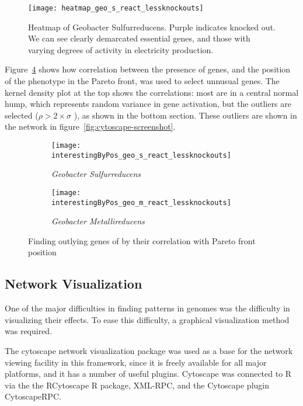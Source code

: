 \documentclass[a4paper,twocolumn]{article}
\begin{document}
\begin{figure}[!htb]
\texttt{[image: heatmap\_geo\_s\_react\_lessknockouts]}
\caption{Heatmap of Geobacter Sulfurreducens. Purple indicates knocked out. We can see clearly demarcated essential genes, and those with varying degrees of activity in electricity production.}
\label{fig:heatmap}
\end{figure}

Figure~\ref{fig:outlyinggenes} shows how correlation between the presence of genes, and the position of the phenotype in the Pareto front, was used to select unnusual genes. The kernel density plot at the top shows the correlations: most are in a central normal hump, which represents random variance in gene activation, but the outliers are selected (\( \rho > 2 \times \sigma \) ), as shown in the bottom section. These outliers are shown in the network in figure~\ref{fig:cytoscape-screenshot}.

\begin{figure}[!htb]
	\begin{subfigure}[htb]{0.5\textwidth}
                \texttt{[image: interestingByPos\_geo\_s\_react\_lessknockouts]}
                \caption{\it Geobacter Sulfurreducens}
                \label{fig:outlyinggenes:sul}
	\end{subfigure}
	\begin{subfigure}[htb]{0.5\textwidth}
                \texttt{[image: interestingByPos\_geo\_m\_react\_lessknockouts]}
                \caption{\it Geobacter Metallireducens}
                \label{fig:outlyinggenes:sul}
	\end{subfigure}
	\caption{Finding outlying genes of by their correlation with Pareto front position}
	\label{fig:outlyinggenes}
\end{figure}

\subsection{Network Visualization}
One of the major difficulties in finding patterns in genomes was the difficulty in visualizing their effects. To ease this difficulty, a graphical visualization method was required.

The cytoscape network visualization package was used as a base for the network viewing facility in this framework, since it is freely available for all major platforms, and it has a number of useful plugins. Cytoscape was connected to R via the the RCytoscape R package, XML-RPC, and the Cytoscape plugin CytoscapeRPC.
\end{document}
